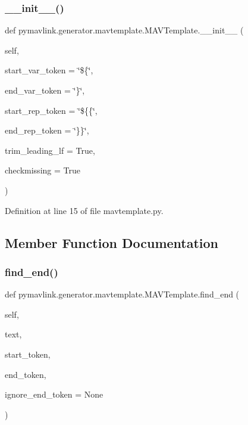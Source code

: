 \subsubsection{\texorpdfstring{\_\_init\_\_()}{\_\_init\_\_()}}
{\footnotesize\ttfamily def pymavlink.\+generator.\+mavtemplate.\+M\+A\+V\+Template.\+\_\+\+\_\+init\+\_\+\+\_\+ (\begin{DoxyParamCaption}\item[{}]{self,  }\item[{}]{start\+\_\+var\+\_\+token = {\ttfamily \char`\"{}\$\{\char`\"{}},  }\item[{}]{end\+\_\+var\+\_\+token = {\ttfamily \char`\"{}\}\char`\"{}},  }\item[{}]{start\+\_\+rep\+\_\+token = {\ttfamily \char`\"{}\$\{\{\char`\"{}},  }\item[{}]{end\+\_\+rep\+\_\+token = {\ttfamily \char`\"{}\}\}\char`\"{}},  }\item[{}]{trim\+\_\+leading\+\_\+lf = {\ttfamily True},  }\item[{}]{checkmissing = {\ttfamily True} }\end{DoxyParamCaption})}



Definition at line 15 of file mavtemplate.\+py.



\subsection{Member Function Documentation}
\mbox{\label{classpymavlink_1_1generator_1_1mavtemplate_1_1MAVTemplate_a4a97cc1d4bfbd4e32953f364507fada8}} 
\subsubsection{\texorpdfstring{find\_end()}{find\_end()}}
{\footnotesize\ttfamily def pymavlink.\+generator.\+mavtemplate.\+M\+A\+V\+Template.\+find\+\_\+end (\begin{DoxyParamCaption}\item[{}]{self,  }\item[{}]{text,  }\item[{}]{start\+\_\+token,  }\item[{}]{end\+\_\+token,  }\item[{}]{ignore\+\_\+end\+\_\+token = {\ttfamily None} }\end{DoxyParamCaption})}


